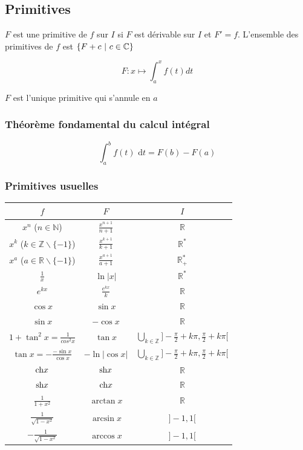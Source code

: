 \documentclass[openany]{book}
\begin{document}
\subsection{Primitives}
$F$ est une primitive de $f$ sur $I$ si $F$ est dérivable sur $I$ et $F' = f$. L'ensemble des primitives de $f$ est $ \{ F+c \text{ } | \text{ } c\in \mathbb{C} \} $

\[ F : x \mapsto \int_{a}^{x} f(t) dt \]

\noindent $F$ est l'unique primitive qui s'annule en $a$

\subsubsection{Théorème fondamental du calcul intégral}
\[ \int_{a}^{b} f(t) \text{ d}t = F(b) - F(a) \]

\subsubsection{Primitives usuelles}

\begin{center}
    \renewcommand{\arraystretch}{1.5}
    \begin{tabular}{|c|c|c|}
        \hline
        $f$ & $F$ & $I$ \\
        \hline
        $x^n$ ($n \in \mathbb{N}$) & $\frac{x^{n+1}}{n+1}$ & $\mathbb{R}$ \\
        \hline
        $x^k$ ($k \in \mathbb{Z}\backslash\{-1\}$) & $\frac{x^{k+1}}{k+1}$ & $\mathbb{R}^*$ \\
        \hline
        $x^a$ ($a \in \mathbb{R}\backslash\{-1\}$) & $\frac{x^{a+1}}{a+1}$ & $\mathbb{R}_+^*$ \\
        \hline
        $\frac{1}{x}$ & $\ln{|x|}$ & $\mathbb{R}^*$ \\
        \hline
        $e^{kx}$ & $\frac{e^{kx}}{k}$ & $\mathbb{R}$ \\
        \hline
        $\cos{x}$ & $\sin{x}$ & $\mathbb{R}$ \\
        \hline
        $\sin{x}$ & $-\cos{x}$ & $\mathbb{R}$ \\
        \hline
        $1+\tan^2{x} = \frac{1}{cos^2{x}}$ & $\tan{x}$ & $\bigcup_{k\in\mathbb{Z}} ] -\frac{\pi}{2} + k\pi, \frac{\pi}{2} + k\pi [$ \\
        \hline
        $\tan{x} = - \frac{- \sin{x}}{\cos{x}}$ & $-\ln{|\cos{x}|}$ & $\bigcup_{k\in\mathbb{Z}} ] -\frac{\pi}{2} + k\pi, \frac{\pi}{2} + k\pi [$ \\
        \hline
        $\text{ch}{x}$ & $\text{sh}{x}$ & $\mathbb{R}$ \\
        \hline
        $\text{sh}{x}$ & $\text{ch}{x}$ & $\mathbb{R}$ \\
        \hline
        $\frac{1}{1+x^2}$ & $\arctan{x}$ & $\mathbb{R}$ \\
        \hline
        $\frac{1}{\sqrt{1-x^2}}$ & $\arcsin{x}$ & $]-1, 1 [$ \\
        \hline
        $-\frac{1}{\sqrt{1-x^2}}$ & $\arccos{x}$ & $]-1, 1 [$ \\
        \hline
    \end{tabular}
\end{center}
\end{document}
